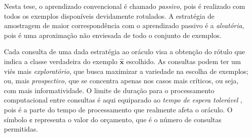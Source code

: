Nesta tese, o aprendizado convencional é chamado \textit{passivo}, pois é realizado com todos os exemplos disponíveis devidamente rotulados.
A estratégia de amostragem de maior correspondência com o aprendizado passivo é a \textit{aleatória}, pois é uma aproximação não enviesada de todo o conjunto de exemplos.

Cada consulta de uma dada estratégia ao oráculo visa a obtenção do rótulo que indica a classe verdadeira do exemplo $\hat{\bm{x}}$ escolhido.
As consultas podem ter um viés mais \textit{exploratório}, que busca maximizar a variedade na escolha de exemplos; 
ou, mais \textit{prospectivo}, que se concentra apenas nos casos mais críticos, ou seja, com mais informatividade.
O limite de duração para o processamento computacional entre consultas é aqui equiparado ao \textit{tempo de espera tolerável} \cite{conf/amcis/Nah03}, pois é a parte do tempo de processamento que realmente afeta o oráculo.
O símbolo $\cent$ representa o valor do orçamento, que é o número de consultas permitidas.

